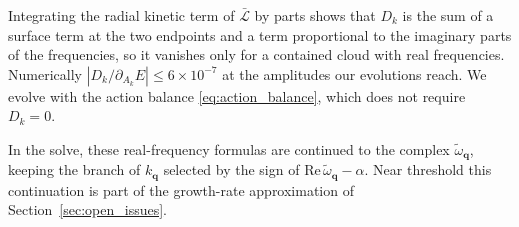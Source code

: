 Integrating the radial kinetic term of $\bar{\mathcal L}$ by parts shows that $D_k$ is the sum of a surface term at the two endpoints and a term proportional to the imaginary parts of the frequencies, so it vanishes only for a contained cloud with real frequencies. Numerically $|D_k/\partial_{A_k}E|\le6\times10^{-7}$ at the amplitudes our evolutions reach. We evolve with the action balance \eqref{eq:action_balance}, which does not require $D_k=0$.



In the solve, these real-frequency formulas are continued to the complex $\tilde\omega_{\mathbf q}$, keeping the branch of $k_{\mathbf q}$ selected by the sign of $\mathrm{Re}\,\tilde\omega_{\mathbf q}-\alpha$. Near threshold this continuation is part of the growth-rate approximation of Section~\ref{sec:open_issues}.


